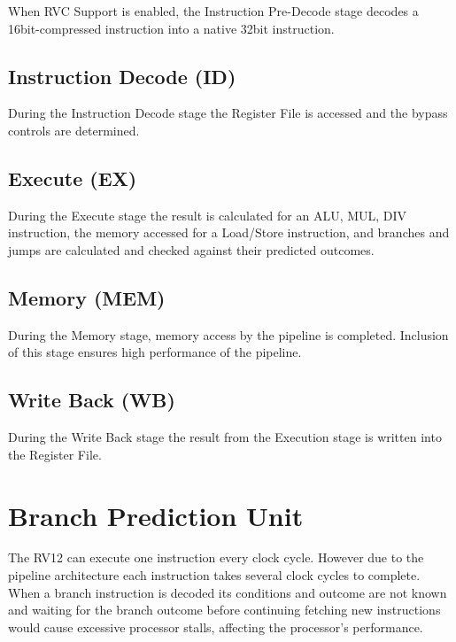 When RVC Support is enabled, the Instruction Pre-Decode stage decodes a
16bit-compressed instruction into a native 32bit instruction.

\subsection{Instruction Decode (ID)} \label{instruction-decode-id}

During the Instruction Decode stage the Register File is accessed and the bypass
controls are determined.

\subsection{Execute (EX)} \label{execute-ex}

During the Execute stage the result is calculated for an ALU, MUL, DIV
instruction, the memory accessed for a Load/Store instruction, and branches and
jumps are calculated and checked against their predicted outcomes.

\subsection{Memory (MEM)} \label{memory-mem}

During the Memory stage, memory access by the pipeline is completed. Inclusion
of this stage ensures high performance of the pipeline.

\subsection{Write Back (WB)} \label{write-back-wb}

During the Write Back stage the result from the Execution stage is written into
the Register File.

\section{Branch Prediction Unit} \label{branch-prediction-unit}

The RV12 can execute one instruction every clock cycle.  However due to the
pipeline architecture each instruction takes several clock cycles to complete.
When a branch instruction is decoded its conditions and outcome are not known
and waiting for the branch outcome before continuing fetching new instructions
would cause excessive processor stalls, affecting the processor's performance.

